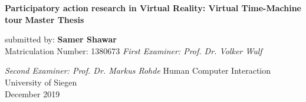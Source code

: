 \begin{titlepage}
    \begin{center}
        \vspace*{1cm}
        \Huge
        \textbf{Participatory action research in Virtual Reality: Virtual Time-Machine tour}
        \vfill
        \LARGE
        \textbf{Master Thesis}
        
        \vspace{0.5cm}
        submitted by:
        \vspace{1.5cm}
        \textbf{Samer Shawar}\\
        Matriculation Number: 1380673
        \vfill
        \textit {First Examiner: Prof. Dr. Volker Wulf}
        
        
        \textit {Second Examiner: Prof. Dr. Markus Rohde}
        \vfill
        \Large
        Human Computer Interaction\\
        University of Siegen\\
        December 2019\\
 \end{center}
\end{titlepage}